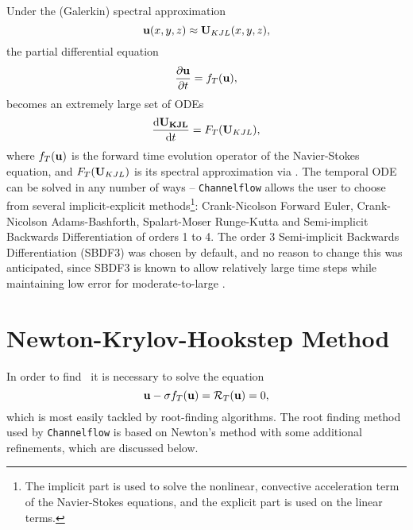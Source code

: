 Under the (Galerkin) spectral approximation 
\begin{equation}
\mathbf{u}(x,y,z) \approx \mathbf{U}_{KJL}(x,y,z),
\end{equation}
the partial differential equation
\begin{equation}
\pder{1}{\Vector{u}}{t} = f_T(\Vector{u}),
\end{equation}
becomes an extremely large set of ODEs
\begin{equation}
\der{1}{\Vector{U_{KJL}}}{t} = F_T(\Vector{U}_{KJL}), 
\end{equation}
where $f_T(\mathbf{u})$ is the forward time evolution operator of the Navier-Stokes equation, and $F_T(\mathbf{U}_{KJL})$ is its spectral approximation via . The temporal ODE can be solved in any number of ways -- {\tt Channelflow} allows the user to choose from several implicit-explicit methods\footnote{The implicit part is used to solve the nonlinear, convective acceleration term of the Navier-Stokes equations, and the explicit part is used on the linear terms.}: Crank-Nicolson Forward Euler, Crank-Nicolson Adams-Bashforth, Spalart-Moser Runge-Kutta and Semi-implicit Backwards Differentiation of orders 1 to 4. The order 3 Semi-implicit Backwards Differentiation (SBDF3) was chosen by default, and no reason to change this was anticipated, since SBDF3 is known to allow relatively large time steps while maintaining low error for moderate-to-large \ReN{}.

\section{Newton-Krylov-Hookstep Method}

In order to find \ecs\, it is necessary to solve the equation
\begin{equation}\label{eq:NRResidual}
\mathbf{u} - \sigma f_T(\mathbf{u}) = \mathcal{R}_T(\mathbf{u}) = 0,
\end{equation}
which is most easily tackled by root-finding algorithms. The root finding method used by {\tt Channelflow} is based on Newton's method with some additional refinements, which are discussed below. \\
